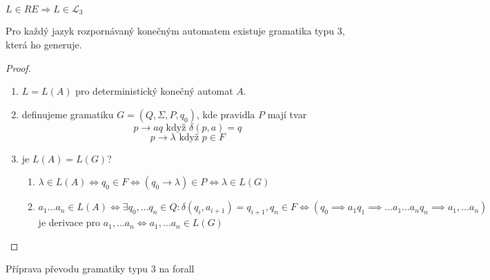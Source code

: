 \documentclass[../main.tex]{subfiles}
\begin{document}
\begin{theorem}
    $L\in RE \Rightarrow L \in \mathcal{L}_3$

    Pro každý jazyk rozpornávaný konečným automatem existuje gramatika typu 3, která ho generuje.
\end{theorem}
\begin{proof}
    \begin{enumerate}
        \item $L = L(A)$ pro deterministický konečný automat $A$.
        \item definujeme gramatiku $G=(Q, \Sigma, P, q_0)$, kde pravidla $P$ mají tvar
        \[p \rightarrow aq \text{ když } \delta(p,a) = q\]
        \[p \rightarrow \lambda \text{ když } p \in F\]
        \item je $L(A) = L(G)$?
        \begin{enumerate}
            \item $\lambda \in L(A) \Leftrightarrow q_0 \in F \Leftrightarrow (q_0 \rightarrow \lambda) \in P
            \Leftrightarrow \lambda \in L(G)$
            \item $a_1 \dots a_n \in L(A) \Leftrightarrow \exists q_0,\dots q_n \in Q : \delta(q_i, a_{i+1}) = q_{i+1},q_n \in F
            \Leftrightarrow (q_0 \implies a_1q_1\implies \dots a_1 \dots a_nq_n \implies a_1,\dots a_n)$ je derivace pro $a_1,\dots a_n
            \Leftrightarrow a_1,\dots a_n \in L(G)$
        \end{enumerate}
    \end{enumerate}
\end{proof}

Příprava převodu gramatiky typu 3 na forall
\end{document}

